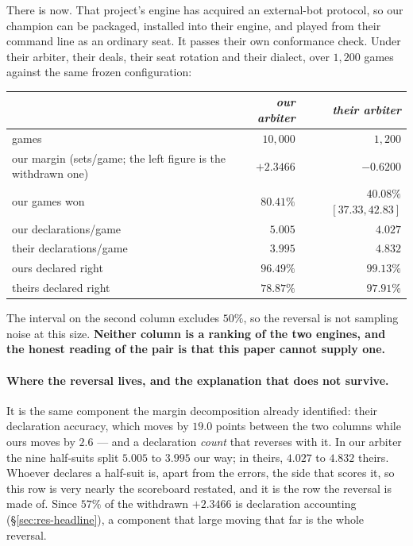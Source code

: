 \documentclass[11pt,letterpaper]{article}
\begin{document}
There is now. That project's engine has acquired an external-bot protocol, so
our champion can be packaged, installed into their engine, and played from
their command line as an ordinary seat. It passes their own conformance check.
Under their arbiter, their deals, their seat rotation and their dialect, over
$1{,}200$ games against the same frozen configuration:

\begin{center}
\small
\begin{tabular}{lrr}
\toprule
& \emph{our arbiter} & \emph{their arbiter} \\
\midrule
games & $10{,}000$ & $1{,}200$ \\
our margin (sets/game; the left figure is the withdrawn one) & $+2.3466$ & $-0.6200$ \\
our games won & $80.41\%$ & $40.08\%$ $[37.33, 42.83]$ \\
our declarations/game & $5.005$ & $4.027$ \\
their declarations/game & $3.995$ & $4.832$ \\
ours declared right & $96.49\%$ & $99.13\%$ \\
theirs declared right & $78.87\%$ & $97.91\%$ \\
\bottomrule
\end{tabular}
\end{center}

\noindent The interval on the second column excludes $50\%$, so the reversal is
not sampling noise at this size. \textbf{Neither column is a ranking of the two
engines, and the honest reading of the pair is that this paper cannot supply
one.}

\paragraph{Where the reversal lives, and the explanation that does not survive.}
It is the same component the margin decomposition already identified: their
declaration accuracy, which moves by $19.0$ points between the two columns
while ours moves by $2.6$ --- and a declaration \emph{count} that reverses with
it. In our arbiter the nine half-suits split $5.005$ to $3.995$ our way; in
theirs, $4.027$ to $4.832$ theirs. Whoever declares a half-suit is, apart from
the errors, the side that scores it, so this row is very nearly the scoreboard
restated, and it is the row the reversal is made of. Since $57\%$ of the withdrawn $+2.3466$ is declaration
accounting (\S\ref{sec:res-headline}), a component that large moving that far
is the whole reversal.
\end{document}
